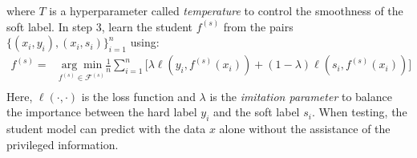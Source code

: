 where $T$ is a hyperparameter called \textit{temperature} to control the smoothness of the soft label. In step 3, learn the student ${f}^{(s)}$ from the pairs $\{\left(x_i,y_i\right),\left(x_i,s_i\right)\}_{i=1}^n$ using:
\begin{equation}\label{eq:distill}
\begin{aligned}
f^{(s)}=&\underset{f^{(s)} \in \mathcal{F}^{(s)}}{\arg \min}\frac{1}{n}\sum_{i=1}^{n}\bigg[\lambda\ell\left(y_i,f^{(s)}(x_i)\right)+(1-\lambda)\ell\left(s_i,f^{(s)}(x_i)\right)\bigg]\\
\end{aligned}
\end{equation}
Here, $\ell(\cdot,\cdot)$ is the loss function and $\lambda$ is the \textit{imitation parameter} to balance the importance between the hard label $y_i$ and the soft label $s_i$. When testing, the student model can predict with the data $x$ alone without the assistance of the privileged information.

